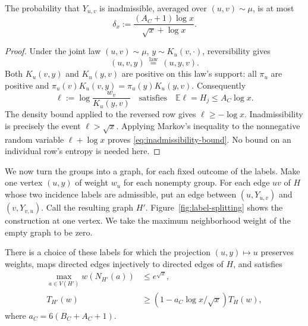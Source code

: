 \begin{lemma}\label{lem:reverse-admissibility}
The probability that $Y_{u,v}$ is inadmissible, averaged over
$(u,v)\sim\mu$, is at most
\begin{equation}\label{eq:inadmissibility-bound}
 \delta_x:=\frac{(A_C+1)\log x}{\sqrt x+\log x}.
\end{equation}
\end{lemma}

\begin{proof}
Under the joint law $(u,v)\sim\mu$, $y\sim K_u(v,\cdot)$,
reversibility gives
\[
 (u,v,y)\ \stackrel{\mathrm{law}}=\ (u,y,v).
\]
Both $K_u(v,y)$ and $K_u(y,v)$ are positive on this law's support:
all $\pi_u$ are positive and
$\pi_u(v)K_u(v,y)=\pi_u(y)K_u(y,v)$.
Consequently
\[
 \ell:=\log\frac{w_v}{K_u(y,v)}
 \quad\text{satisfies}\quad
 \mathbb E\ell=H_j\le A_C\log x.
\]
The density bound applied to the reversed row gives $\ell\ge-\log x$.
Inadmissibility is precisely the event $\ell>\sqrt x$. Applying Markov's
inequality to the nonnegative random variable $\ell+\log x$ proves
\eqref{eq:inadmissibility-bound}. No bound on an individual row's
entropy is needed here.
\end{proof}

We now turn the groups into a graph, for each fixed outcome of the labels.
Make one vertex $(u,y)$ of weight $w_u$ for each nonempty group.
For each edge $uv$ of $H$ whose two incidence labels are admissible,
put an edge between $(u,Y_{u,v})$ and $(v,Y_{v,u})$.
Call the resulting graph $H'$. Figure~\ref{fig:label-splitting} shows
the construction at one vertex.
We take the maximum neighborhood weight of the empty graph to be zero.


\begin{lemma}\label{lem:weighted-splitting}
There is a choice of these labels for which the projection
$(u,y)\mapsto u$ preserves weights, maps directed edges injectively
to directed edges of $H$, and satisfies
\begin{align}
 \max_{a\in V(H')}w(N_{H'}(a))&\le e^{\sqrt x},
 \label{eq:split-neighborhood}\\
 T_{H'}(w)&\ge(1-a_C\log x/\sqrt x)T_H(w),
 \label{eq:split-triangles}
\end{align}
where $a_C=6(B_C+A_C+1)$.
\end{lemma}

